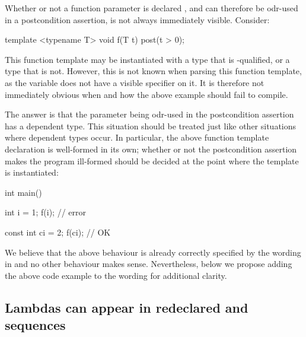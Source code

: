 Whether or not a function parameter is declared , and can therefore be odr-used in a postcondition assertion, is not always immediately visible. Consider:
\begin{codeblock}
template <typename T> 
void f(T t) post(t > 0); 
\end{codeblock}
This function template may be instantiated with a type that is -qualified, or a type that is not. However, this is not known when parsing this function template, as the variable  does not have a visible  specifier on it. It is therefore not immediately obvious when and how the above example should fail to compile.

The answer is that the parameter  being odr-used in the postcondition assertion has a dependent type. This situation should be treated just like other situations where dependent types occur. In particular, the above function template declaration is well-formed in its own; whether or not the postcondition assertion makes the program ill-formed should be decided at the point where the template is instantiated:
\begin{codeblock}
int main() {
  int i = 1;
  f(i);   // error

  const int ci = 2;
  f(ci);  // OK
}
\end{codeblock}
We believe that the above behaviour is already correctly specified by the wording in \cite{P2900R10} and no other behaviour makes sense. Nevertheless, below we propose adding the above code example to the wording for additional clarity.

\subsection{Lambdas can appear in redeclared  and  sequences}


